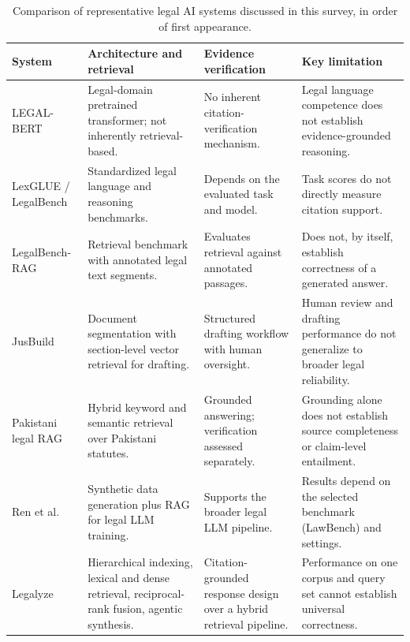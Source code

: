 \begin{table}[tp]
\centering
\caption{Comparison of representative legal AI systems discussed in this survey, in order of first appearance.}
\label{tab:comp}
\footnotesize
\setlength{\tabcolsep}{5pt}
\renewcommand{\arraystretch}{1.25}
\begin{tabularx}{\textwidth}{>{\raggedright\arraybackslash}p{2.6cm} >{\raggedright\arraybackslash}X >{\raggedright\arraybackslash}X >{\raggedright\arraybackslash}X}
\toprule
\textbf{System} & \textbf{Architecture and retrieval} & \textbf{Evidence verification} & \textbf{Key limitation} \\
\midrule
LEGAL-BERT \citep{chalkidis2020} & Legal-domain pretrained transformer; not inherently retrieval-based. & No inherent citation-verification mechanism. & Legal language competence does not establish evidence-grounded reasoning. \\
LexGLUE / LegalBench \citep{chalkidis2022, guha2023} & Standardized legal language and reasoning benchmarks. & Depends on the evaluated task and model. & Task scores do not directly measure citation support. \\
LegalBench-RAG \citep{pipitone2024} & Retrieval benchmark with annotated legal text segments. & Evaluates retrieval against annotated passages. & Does not, by itself, establish correctness of a generated answer. \\
JusBuild \citep{buffa2025} & Document segmentation with section-level vector retrieval for drafting. & Structured drafting workflow with human oversight. & Human review and drafting performance do not generalize to broader legal reliability. \\
Pakistani legal RAG \citep{ref312025} & Hybrid keyword and semantic retrieval over Pakistani statutes. & Grounded answering; verification assessed separately. & Grounding alone does not establish source completeness or claim-level entailment. \\
Ren et al.\ \citep{ren2026} & Synthetic data generation plus RAG for legal LLM training. & Supports the broader legal LLM pipeline. & Results depend on the selected benchmark (LawBench) and settings. \\
Legalyze \citep{hamza2026} & Hierarchical indexing, lexical and dense retrieval, reciprocal-rank fusion, agentic synthesis. & Citation-grounded response design over a hybrid retrieval pipeline. & Performance on one corpus and query set cannot establish universal correctness. \\
\bottomrule
\end{tabularx}
\end{table}

